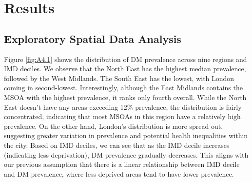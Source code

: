 \chapter{Results}
\label{chap:4}
\section{Exploratory Spatial Data Analysis}
\label{chap:4.1}
Figure \ref{fig:A4.1} shows the distribution of DM prevalence across nine regions and IMD deciles. We observe that the North East has the highest median prevalence, followed by the West Midlands. The South East has the lowest, with London coming in second-lowest. Interestingly, although the East Midlands contains the MSOA with the highest prevalence, it ranks only fourth overall. While the North East doesn’t have any areas exceeding 12\% prevalence, the distribution is fairly concentrated, indicating that most MSOAs in this region have a relatively high prevalence. On the other hand, London’s distribution is more spread out, suggesting greater variation in prevalence and potential health inequalities within the city. Based on IMD deciles, we can see that as the IMD decile increases (indicating less deprivation), DM prevalence gradually decreases. This aligns with our previous assumption that there is a linear relationship between IMD decile and DM prevalence, where less deprived areas tend to have lower prevalence.

